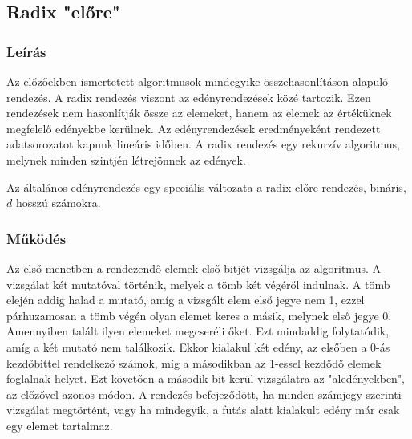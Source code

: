 \documentclass{elteikthesis}
\begin{document}
\subsection{Radix "előre"}
\subsubsection{Leírás}
Az előzőekben ismertetett algoritmusok mindegyike összehasonlításon alapuló rendezés. A radix rendezés viszont az edényrendezések közé tartozik. Ezen rendezések nem hasonlítják össze az elemeket, hanem az elemek az értéküknek megfelelő edényekbe kerülnek. Az edényrendezések eredményeként rendezett adatsorozatot kapunk lineáris időben. 
A radix rendezés egy rekurzív algoritmus, melynek minden szintjén létrejönnek az edények.\par
Az általános edényrendezés egy speciális változata a radix előre rendezés, bináris, $d$ hosszú számokra.\par
\subsubsection{Működés}
Az első menetben a rendezendő elemek első bitjét vizsgálja az algoritmus. A vizsgálat két mutatóval történik, melyek a tömb két végéről indulnak. A tömb elején addig halad a mutató, amíg a vizsgált elem első jegye nem 1, ezzel párhuzamosan a tömb végén olyan elemet keres a másik, melynek első jegye 0. Amennyiben talált ilyen elemeket megcseréli őket. Ezt mindaddig folytatódik, amíg a két mutató nem találkozik. Ekkor kialakul két edény, az elsőben a 0-ás kezdőbittel rendelkező számok, míg a másodikban az 1-essel kezdődő elemek foglalnak helyet. Ezt követően a második bit kerül vizsgálatra az "aledényekben", az előzővel azonos módon. A rendezés befejeződött, ha minden számjegy szerinti vizsgálat megtörtént, vagy ha mindegyik, a futás alatt kialakult edény már csak egy elemet tartalmaz.
\end{document}
